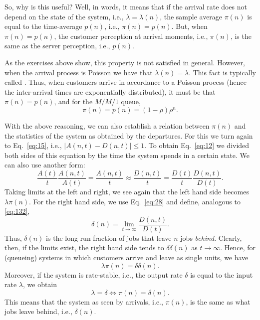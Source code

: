 So, why is this useful? Well, in words, it means that if the arrival
rate does not depend on the state of the system, i.e.,
$\lambda=\lambda(n)$, the sample average $\pi(n)$ is equal to the
time-average $p(n)$, i.e., $\pi(n)=p(n)$. But, when $\pi(n)=p(n)$, the
customer perception at arrival moments, i.e., $\pi(n)$, is the same as
the server perception, i.e., $p(n)$.

As the exercises above show, this property is not satisfied in
general.  However,  when the arrival process is
Poisson we have that $\lambda(n)=\lambda$. This fact is typically called . Thus, when customers arrive in
accordance to a Poisson process (hence the inter-arrival times are
exponentially distributed), it must be that $\pi(n) = p(n)$, and
for the $M/M/1$ queue,
\begin{equation*}
  \pi(n) = p(n) = (1-\rho)\rho^n.
\end{equation*}


With the above reasoning, we can also establish a relation between
$\pi(n)$ and the statistics of the system as obtained by the
departures. For this we
turn again to Eq.~\eqref{eq:15}, i.e., $|A(n,t) - D(n,t)| \leq 1$. To
obtain Eq.~\eqref{eq:12} we divided both sides of this equation by the
time the system spends in a certain state. We can also use another
form:
\begin{equation*}
\frac{A(t)}t \frac{A(n,t)}{A(t)} = \frac{A(n,t)}t \approx \frac{D(n,t)}t 
= \frac{D(t)}t \frac{D(n,t)}{D(t)}.
\end{equation*}
Taking limits at the left and right, we see again that the left hand side
becomes $\lambda \pi(n)$. For the right hand side, we use
Eq.~\eqref{eq:28} and define, analogous to \eqref{eq:132}, 
\begin{equation}
  \label{eq:33}
  \delta(n) = \lim_{t\to\infty} \frac{D(n,t)}{D(t)}.
\end{equation}
Thus, $\delta(n)$ is the long-run fraction of jobs that leave $n$ jobs
\emph{behind}. Clearly, then, if the limits exist, the right hand side
tends to $\delta \delta(n)$ as $t\to\infty$. Hence, for (queueing)
systems in which customers arrive and leave as single units, we have
\begin{equation}
  \label{eq:36}
  \lambda \pi(n) = \delta \delta(n).
\end{equation}
Moreover, if the system is rate-stable, i.e., the output rate $\delta$ is equal to the input rate $\lambda$, we obtain
\begin{equation}
  \label{eq:39}
\lambda = \delta \iff  \pi(n) = \delta(n).
\end{equation}
This means that the system as seen by arrivals, i.e., $\pi(n)$, is
the same as what jobs leave behind, i.e., $\delta(n)$.


